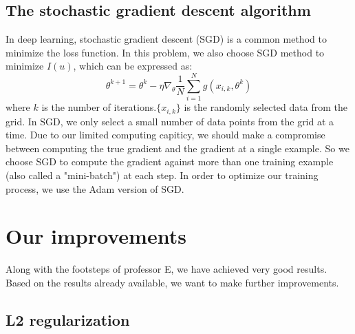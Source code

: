 \documentclass{article}
\begin{document}
 \subsection{The stochastic gradient descent algorithm}
 In deep learning, stochastic gradient descent (SGD) is a common method to minimize the loss function. In this problem, we also choose SGD method to minimize $I(u)$, which can be expressed as:
 \begin{equation}
 \theta^{k+1}=\theta^{k}-\eta \nabla_{\theta}\frac{1}{N}\sum\limits_{i=1}^{N}g(x_{i,k},\theta^k)
 \end{equation}
 where $k$ is the number of iterations.$\{x_{i,k}\}$ is the randomly selected data from the grid. In SGD, we only select a small number of data points from the grid at a time. Due to our limited computing capiticy, we should make a compromise  between computing the true gradient and the gradient at a single example. So we choose SGD to compute the gradient against more than one training example (also called a "mini-batch") at each step. In order to optimize our training process, we use the Adam version of SGD.


\section{Our improvements}
\par Along with the footsteps of professor E, we have achieved very good results. Based on the results already available, we want to make further improvements. 

\subsection{L2 regularization}
\end{document}
